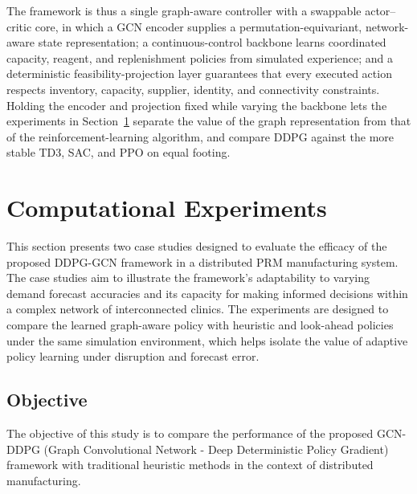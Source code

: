 \documentclass[preprint,review,12pt,nonatbib]{elsarticle}
\providecommand{\DIFadd}[1]{{\protect\color{blue}#1}} %
\providecommand{\DIFdel}[1]{} %
\providecommand{\DIFaddbegin}{} %
\providecommand{\DIFaddend}{} %
\providecommand{\DIFdelbegin}{} %
\providecommand{\DIFdelend}{} %
\providecommand{\DIFscaledelfig}{0.5}
\newlength{\DIFdelgraphicswidth} %
\newlength{\DIFdelgraphicsheight} %
\providecommand{\DIFaddincludegraphics}[2][]{{\color{blue}\fbox{\DIFOincludegraphics[#1]{#2}}}} %
\providecommand{\DIFdelincludegraphics}[2][]{%
\sbox{\DIFdelgraphicsbox}{\DIFOincludegraphics[#1]{#2}}%
\settoboxwidth{\DIFdelgraphicswidth}{\DIFdelgraphicsbox} %
\settoboxtotalheight{\DIFdelgraphicsheight}{\DIFdelgraphicsbox} %
\scalebox{\DIFscaledelfig}{%
\parbox[b]{\DIFdelgraphicswidth}{\usebox{\DIFdelgraphicsbox}\\[-\baselineskip] \rule{\DIFdelgraphicswidth}{0em}}\llap{\resizebox{\DIFdelgraphicswidth}{\DIFdelgraphicsheight}{%
\setlength{\unitlength}{\DIFdelgraphicswidth}%
\begin{picture}(1,1)%
\thicklines\linethickness{2pt} %
{\color[rgb]{1,0,0}\put(0,0){\framebox(1,1){}}}%
{\color[rgb]{1,0,0}\put(0,0){\line( 1,1){1}}}%
{\color[rgb]{1,0,0}\put(0,1){\line(1,-1){1}}}%
\end{picture}%
}\hspace*{3pt}}} %
} %
\DeclareRobustCommand{\DIFaddbegin}{\DIFOaddbegin \let\includegraphics\DIFaddincludegraphics} %
\DeclareRobustCommand{\DIFaddend}{\DIFOaddend \let\includegraphics\DIFOincludegraphics} %
\DeclareRobustCommand{\DIFdelbegin}{\DIFOdelbegin \let\includegraphics\DIFdelincludegraphics} %
\DeclareRobustCommand{\DIFdelend}{\DIFOaddend \let\includegraphics\DIFOincludegraphics} %
\begin{document}
\DIFdel{This proposed DDPG-GCN model offers a robust approach for distributed manufacturing. By melding the strengths of GCN and DDPG, it provides a nuanced understanding of intricate manufacturing networks, ensuring efficient and optimized decision-making. The dynamic nature and intricate dependencies found in distributed manufacturing necessitate advanced solutions capable of understanding and optimizing such networks. The integration of DDPG and GCN, as presented in this paper, provides a promising avenue for addressing the challenges inherent in distributed manufacturing systems. With the capability to process graph-based states effectively, }\DIFdelend \DIFaddbegin \DIFadd{The framework is thus a single graph-aware controller with a swappable actor--critic core, in which a GCN encoder supplies a permutation-equivariant, network-aware state representation; a continuous-control backbone learns coordinated capacity, reagent, and replenishment policies from simulated experience; and a deterministic feasibility-projection layer guarantees that every executed action respects inventory, capacity, supplier, identity, and connectivity constraints. Holding the encoder and projection fixed while varying the backbone lets the experiments in Section~\ref{sec:experiments} separate the value of the graph representation from that of }\DIFaddend the \DIFdelbegin \DIFdel{DDPG-GCN model offers substantial improvements in service level, efficiency, and resilience against disruptions}\DIFdelend \DIFaddbegin \DIFadd{reinforcement-learning algorithm, and compare DDPG against the more stable TD3, SAC, and PPO on equal footing}\DIFaddend .
\section{Computational Experiments}
\label{sec:experiments}
\label{sec:casestudies}

This section presents two case studies designed to evaluate the efficacy of the proposed DDPG-GCN framework in a distributed PRM manufacturing system. The case studies aim to illustrate the framework's adaptability to varying demand forecast accuracies and its capacity for making informed decisions within a complex network of interconnected clinics. The experiments are designed to compare the learned graph-aware policy with heuristic and look-ahead policies under the same simulation environment, which helps isolate the value of adaptive policy learning under disruption and forecast error.
\subsection{Objective}
The objective of this study is to compare the performance of the proposed GCN-DDPG (Graph Convolutional Network - Deep Deterministic Policy Gradient) framework with traditional heuristic methods in the context of distributed manufacturing.
\end{document}
